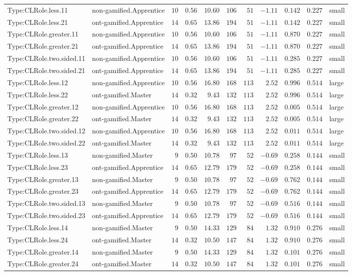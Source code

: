 \documentclass[6pt,a4paper]{article}
\begin{document}
{\begin{longtable}{llrrrrrrrrl}
Type:CLRole.less.11&non-gamified.Apprentice&$10$&$0.56$&$10.60$&$106$&$ 51$&$-1.11$&$0.142$&$0.227$&small\tabularnewline
Type:CLRole.less.21&ont-gamified.Apprentice&$14$&$0.65$&$13.86$&$194$&$ 51$&$-1.11$&$0.142$&$0.227$&small\tabularnewline
Type:CLRole.greater.11&non-gamified.Apprentice&$10$&$0.56$&$10.60$&$106$&$ 51$&$-1.11$&$0.870$&$0.227$&small\tabularnewline
Type:CLRole.greater.21&ont-gamified.Apprentice&$14$&$0.65$&$13.86$&$194$&$ 51$&$-1.11$&$0.870$&$0.227$&small\tabularnewline
Type:CLRole.two.sided.11&non-gamified.Apprentice&$10$&$0.56$&$10.60$&$106$&$ 51$&$-1.11$&$0.285$&$0.227$&small\tabularnewline
Type:CLRole.two.sided.21&ont-gamified.Apprentice&$14$&$0.65$&$13.86$&$194$&$ 51$&$-1.11$&$0.285$&$0.227$&small\tabularnewline
Type:CLRole.less.12&non-gamified.Apprentice&$10$&$0.56$&$16.80$&$168$&$113$&$ 2.52$&$0.996$&$0.514$&large\tabularnewline
Type:CLRole.less.22&ont-gamified.Master&$14$&$0.32$&$ 9.43$&$132$&$113$&$ 2.52$&$0.996$&$0.514$&large\tabularnewline
Type:CLRole.greater.12&non-gamified.Apprentice&$10$&$0.56$&$16.80$&$168$&$113$&$ 2.52$&$0.005$&$0.514$&large\tabularnewline
Type:CLRole.greater.22&ont-gamified.Master&$14$&$0.32$&$ 9.43$&$132$&$113$&$ 2.52$&$0.005$&$0.514$&large\tabularnewline
Type:CLRole.two.sided.12&non-gamified.Apprentice&$10$&$0.56$&$16.80$&$168$&$113$&$ 2.52$&$0.011$&$0.514$&large\tabularnewline
Type:CLRole.two.sided.22&ont-gamified.Master&$14$&$0.32$&$ 9.43$&$132$&$113$&$ 2.52$&$0.011$&$0.514$&large\tabularnewline
Type:CLRole.less.13&non-gamified.Master&$ 9$&$0.50$&$10.78$&$ 97$&$ 52$&$-0.69$&$0.258$&$0.144$&small\tabularnewline
Type:CLRole.less.23&ont-gamified.Apprentice&$14$&$0.65$&$12.79$&$179$&$ 52$&$-0.69$&$0.258$&$0.144$&small\tabularnewline
Type:CLRole.greater.13&non-gamified.Master&$ 9$&$0.50$&$10.78$&$ 97$&$ 52$&$-0.69$&$0.762$&$0.144$&small\tabularnewline
Type:CLRole.greater.23&ont-gamified.Apprentice&$14$&$0.65$&$12.79$&$179$&$ 52$&$-0.69$&$0.762$&$0.144$&small\tabularnewline
Type:CLRole.two.sided.13&non-gamified.Master&$ 9$&$0.50$&$10.78$&$ 97$&$ 52$&$-0.69$&$0.516$&$0.144$&small\tabularnewline
Type:CLRole.two.sided.23&ont-gamified.Apprentice&$14$&$0.65$&$12.79$&$179$&$ 52$&$-0.69$&$0.516$&$0.144$&small\tabularnewline
Type:CLRole.less.14&non-gamified.Master&$ 9$&$0.50$&$14.33$&$129$&$ 84$&$ 1.32$&$0.910$&$0.276$&small\tabularnewline
Type:CLRole.less.24&ont-gamified.Master&$14$&$0.32$&$10.50$&$147$&$ 84$&$ 1.32$&$0.910$&$0.276$&small\tabularnewline
Type:CLRole.greater.14&non-gamified.Master&$ 9$&$0.50$&$14.33$&$129$&$ 84$&$ 1.32$&$0.101$&$0.276$&small\tabularnewline
Type:CLRole.greater.24&ont-gamified.Master&$14$&$0.32$&$10.50$&$147$&$ 84$&$ 1.32$&$0.101$&$0.276$&small\tabularnewline

\end{longtable}}
\end{document}
